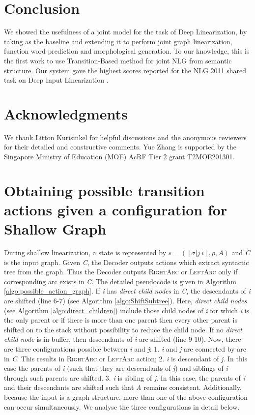\documentclass[11pt]{article}
\begin{document}
\section{Conclusion}
We showed the usefulness of a joint model for the task of Deep Linearization, by taking \cite{N16-1058} as the baseline and extending it to perform joint graph linearization, function word prediction and morphological generation. To our knowledge, this is the first work to use Transition-Based method for joint NLG from semantic structure. 
Our system gave the highest scores reported for the NLG 2011 shared task on Deep Input Linearization \cite{belz2011first}. 



\section*{Acknowledgments}
We thank Litton Kurisinkel for helpful discussions and the anonymous reviewers for their detailed and constructive comments. Yue Zhang is supported by the Singapore Ministry of Education (MOE) AcRF Tier 2 grant T2MOE201301.



\newpage
\appendix

\section{Obtaining possible transition actions given a configuration for Shallow Graph}
\label{sec:appendix-B}
During shallow linearization, a state is represented by $s=([\sigma| j\ i], \rho, A)$ and {\it C} is the input graph. Given {\it C}, the Decoder outputs actions which extract syntactic tree from the graph. Thus the Decoder outputs \textsc{RightArc} or \textsc{LeftArc} only if corresponding arc exists in {\it C}. The detailed pseudocode is given in Algorithm \ref{algo:possible_action_graph}. If {\it i} has {\it direct child nodes} in {\it C}, the descendants of {\it i} are shifted (line 6-7) (see Algorithm \ref{algo:ShiftSubtree}). Here, {\it direct child nodes} (see Algorithm \ref{algo:direct_children}) include those child nodes of {\it i} for which {\it i} is the only parent or if there is more than one parent then every other parent is shifted on to the stack without possibility to reduce the child node. If no {\it direct child node} is in buffer, then descendants of {\it i} are shifted (line 9-10). Now, there are three configurations possible between {\it i} and {\it j}: 1. {\it i} and {\it j} are connected by arc in {\it C}. This results in \textsc{RightArc} or \textsc{LeftArc} action; 2. {\it i} is descendant of {\it j}. In this case the parents of {\it i} (such that they are descendants of {\it j}) and siblings of {\it i} through such parents are shifted. 3. {\it i} is sibling of {\it j}. In this case, the parents of {\it i} and their descendants are shifted such that {\it A} remains consistent. Additionally, because the input is a graph structure, more than one of the above configuration can occur simultaneously. We analyse the three configurations in detail below.
\end{document}
